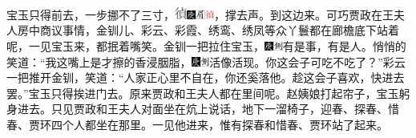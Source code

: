 宝玉只得前去，一步挪不了三寸，\includegraphics[width=4mm]{../images/00015}{\includegraphics[width=3mm]{../Images/00004}\includegraphics[width=3mm]{../Images/00010}\footnotesize \kaishu \includegraphics[width=3mm]{../images/00016}，撑去声。}到这边来。可巧贾政在王夫人房中商议事情，金钏儿、彩云、彩霞、绣鸾、绣凤等众丫鬟都在廊檐底下站着呢，一见宝玉来，都抿着嘴笑。金钏一把拉住宝玉，{\includegraphics[width=3mm]{../Images/00004}\includegraphics[width=3mm]{../Images/00011}\footnotesize \kaishu 有是事，有是人。}悄悄的笑道：``我这嘴上是才擦的香浸胭脂，{\includegraphics[width=3mm]{../Images/00004}\includegraphics[width=3mm]{../Images/00011}\footnotesize \kaishu 活像活现。}你这会子可吃不吃了？''彩云一把推开金钏，笑道：``人家正心里不自在，你还奚落他。趁这会子喜欢，快进去罢。''宝玉只得挨进门去。原来贾政和王夫人都在里间呢。赵姨娘打起帘子，宝玉躬身进去。只见贾政和王夫人对面坐在炕上说话，地下一溜椅子，迎春、探春、惜春、贾环四个人都坐在那里。一见他进来，惟有探春和惜春、贾环站了起来。

